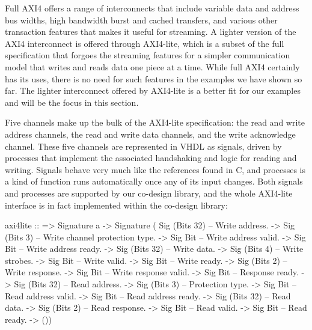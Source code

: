 \documentclass[../paper.tex]{subfiles}
\begin{document}
Full AXI4 offers a range of interconnects that include variable data and address bus widths, high bandwidth burst and cached transfers, and various other transaction features that makes it useful for streaming. A lighter version of the AXI4 interconnect is offered through AXI4-lite, which is a subset of the full specification that forgoes the streaming features for a simpler communication model that writes and reads data one piece at a time. While full AXI4 certainly has its uses, there is no need for such features in the examples we have shown so far. The lighter interconnect offered by AXI4-lite is a better fit for our examples and will be the focus in this section.


Five channels make up the bulk of the AXI4-lite specification: the read and write address channels, the read and write data channels, and the write acknowledge channel. These five channels are represented in VHDL as signals, driven by processes that implement the associated handshaking and logic for reading and writing. Signals behave very much like the references found in C, and processes is a kind of function runs automatically once any of its input changes. Both signals and processes are supported by our co-design library, and the whole AXI4-lite interface is in fact implemented within the co-design library:


\begin{code}
axi4lite ::
  => Signature a
  -> Signature (
          Sig (Bits 32) -- Write address.
       -> Sig (Bits 3)  -- Write channel protection type.
       -> Sig Bit       -- Write address valid.
       -> Sig Bit       -- Write address ready.
       -> Sig (Bits 32) -- Write data.
       -> Sig (Bits 4)  -- Write strobes.
       -> Sig Bit       -- Write valid.
       -> Sig Bit       -- Write ready.
       -> Sig (Bits 2)  -- Write response.
       -> Sig Bit       -- Write response valid.
       -> Sig Bit       -- Response ready.
       -> Sig (Bits 32) -- Read address.
       -> Sig (Bits 3)  -- Protection type.
       -> Sig Bit       -- Read address valid.
       -> Sig Bit       -- Read address ready.
       -> Sig (Bits 32) -- Read data.
       -> Sig (Bits 2)  -- Read response.
       -> Sig Bit       -- Read valid.
       -> Sig Bit       -- Read ready.    
       -> ())
\end{code}
\end{document}
